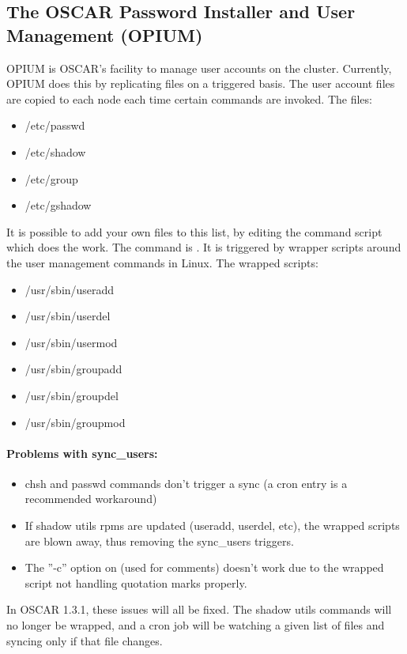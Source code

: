%
%
%

\subsection{The OSCAR Password Installer and User Management (OPIUM)}
\label{app:opium-overview}

OPIUM is OSCAR's facility to manage user accounts on the cluster.  Currently,
OPIUM does this by replicating files on a triggered basis.  The user account
files are copied to each node each time certain commands are invoked.
The files:
\begin{itemize}
\item /etc/passwd
\item /etc/shadow
\item /etc/group
\item /etc/gshadow
\end{itemize}
It is possible to add your own files to this list, by editing the command
script which does the work.
The command is .  It is triggered by wrapper
scripts around the user management commands in Linux.  The wrapped scripts:
\begin{itemize}
\item /usr/sbin/useradd
\item /usr/sbin/userdel
\item /usr/sbin/usermod
\item /usr/sbin/groupadd
\item /usr/sbin/groupdel
\item /usr/sbin/groupmod
\end{itemize}

\paragraph{Problems with sync\_users:}
\begin{itemize}
\item chsh and passwd commands don't trigger a sync (a cron entry is a
recommended workaround)
\item If shadow utils rpms are updated (useradd, userdel, etc), the wrapped 
scripts are blown away, thus removing the sync\_users triggers.
\item The ''-c'' option on (used for comments) doesn't work due to
the wrapped script not handling quotation marks properly.
\end{itemize}
In OSCAR 1.3.1, these issues will all be fixed.  The shadow utils commands
will no longer be wrapped, and a cron job will be watching a given list of
files and syncing only if that file changes.

